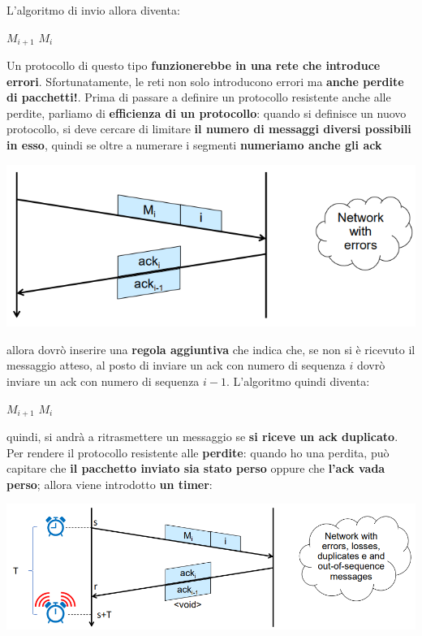 \documentclass[12pt]{article}
\begin{document}
L'algoritmo di invio allora diventa: \newline
\begin{algorithm}[H]
\DontPrintSemicolon
{} {
    $M_{i+1}$
} {
    $M_i$ 
}
\end{algorithm}
\noindent
Un protocollo di questo tipo \textbf{funzionerebbe in una rete che introduce errori}. Sfortunatamente, le reti non solo introducono errori ma \textbf{anche perdite di pacchetti!}.
Prima di passare a definire un protocollo resistente anche alle perdite, parliamo di \textbf{efficienza di un protocollo}: quando si definisce un nuovo protocollo, si deve cercare di limitare
\textbf{il numero di messaggi diversi possibili in esso}, quindi se oltre a numerare i segmenti \textbf{numeriamo anche gli ack}
\begin{center}
    \includegraphics[width = 0.80\linewidth]{Images/49.png}
\end{center}
allora dovrò inserire una \textbf{regola aggiuntiva} che indica che, se non si è ricevuto il messaggio atteso, al posto di inviare un ack con numero di sequenza $i$ dovrò
inviare un ack con numero di sequenza $i-1$. L'algoritmo quindi diventa: \newline
\begin{algorithm}[H]
    \DontPrintSemicolon
     {
        $M_{i+1}$
    } {
        $M_i$ 
    }
    \end{algorithm}
\noindent
quindi, si andrà a ritrasmettere un messaggio se \textbf{si riceve un ack duplicato}.
Per rendere il protocollo resistente alle \textbf{perdite}: quando ho una perdita, può capitare che \textbf{il pacchetto inviato sia stato perso}
oppure che \textbf{l'ack vada perso}; allora viene introdotto \textbf{un timer}:
\begin{center}
    \includegraphics[width = 1\linewidth]{Images/50.png}
\end{center}
\end{document}
